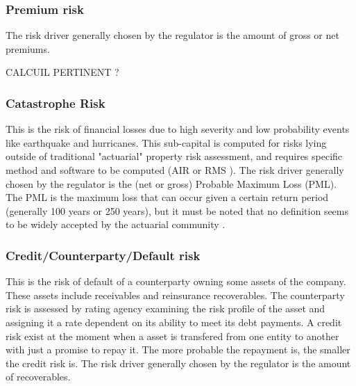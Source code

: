 \subsubsection{Premium risk}


The risk driver generally chosen by the regulator is the amount of gross or net premiums.


CALCUIL PERTINENT ?


\subsubsection{Catastrophe Risk}

This is the risk of financial losses due to high severity and low probability events like earthquake and hurricanes. This sub-capital is computed for risks lying outside of traditional "actuarial" property risk assessment, and requires specific method and software to be computed (AIR \cite{air} or RMS \cite{rms}). The risk driver generally chosen by the regulator is the (net or gross) Probable Maximum Loss (PML). The PML is the maximum loss that can occur given a certain return period (generally 100 years or 250 years), but it must be noted that no definition seems to be widely accepted by the actuarial community \cite{AssociationofBritish}.

\subsubsection{Credit/Counterparty/Default risk}

This is the risk of default of a counterparty owning some assets of the company. These assets include receivables and reinsurance recoverables. The counterparty risk is assessed by rating agency examining the risk profile of the asset and assigning it a rate dependent on its ability to meet its debt payments. A credit risk exist at the moment when a asset is transfered from one entity to another with just a promise to repay it. The more probable the repayment is, the smaller the credit risk is. The risk driver generally chosen by the regulator is the amount of recoverables.


